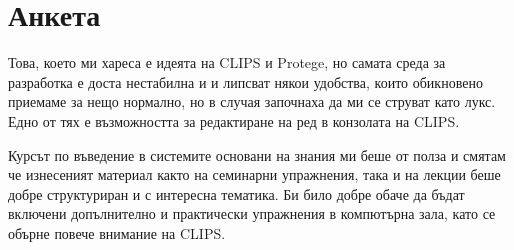 \documentclass[a4paper,12pt]{article}
\begin{document}
\section{Анкета}
Това, което ми хареса е идеята на CLIPS и Protege, но самата среда за разработка е доста нестабилна и и липсват някои удобства, които обикновено приемаме за нещо нормално, но в случая започнаха да ми се струват като лукс. Едно от тях е възможността за редактиране на ред в конзолата на CLIPS.

Курсът по въведение в системите основани на знания ми беше от полза и смятам че изнесеният материал както на семинарни упражнения, така и на лекции беше добре структуриран и с интересна тематика. Би било добре обаче да бъдат включени допълнително и практически упражнения в компютърна зала, като се обърне повече внимание на CLIPS.
\end{document}
